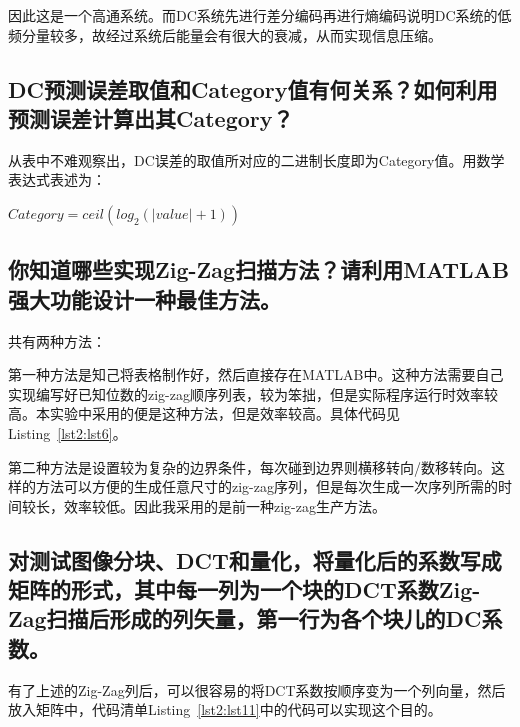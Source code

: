 \documentclass[a4paper]{article}
\begin{document}
		因此这是一个高通系统。而DC系统先进行差分编码再进行熵编码说明DC系统的低频分量较多，故经过系统后能量会有很大的衰减，从而实现信息压缩。
		
		\subsection{DC预测误差取值和Category值有何关系？如何利用预测误差计算出其Category？}
		
		从表中不难观察出，DC误差的取值所对应的二进制长度即为Category值。用数学表达式表述为：
		\begin{center}
			$ Category = ceil(log_2(|value| + 1)) $
		\end{center}
		
		\subsection{你知道哪些实现Zig-Zag扫描方法？请利用MATLAB强大功能设计一种最佳方法。}
		
		共有两种方法：
		
		第一种方法是知己将表格制作好，然后直接存在MATLAB中。这种方法需要自己实现编写好已知位数的zig-zag顺序列表，较为笨拙，但是实际程序运行时效率较高。本实验中采用的便是这种方法，但是效率较高。具体代码见Listing~\ref{lst2:lst6}。
		
		
		
		第二种方法是设置较为复杂的边界条件，每次碰到边界则横移转向/数移转向。这样的方法可以方便的生成任意尺寸的zig-zag序列，但是每次生成一次序列所需的时间较长，效率较低。因此我采用的是前一种zig-zag生产方法。
		
		\subsection{对测试图像分块、DCT和量化，将量化后的系数写成矩阵的形式，其中每一列为一个块的DCT系数Zig-Zag扫描后形成的列矢量，第一行为各个块儿的DC系数。}
		
		有了上述的Zig-Zag列后，可以很容易的将DCT系数按顺序变为一个列向量，然后放入矩阵中，代码清单Listing~\ref{lst2:lst11}中的代码可以实现这个目的。
		
		
		
\end{document}
